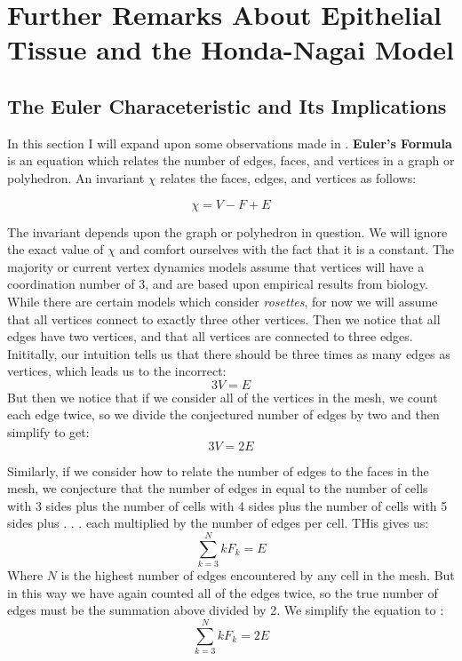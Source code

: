\chapter{Further Remarks About Epithelial Tissue and the Honda-Nagai Model}

\section{The Euler Characeteristic and Its Implications}
In this section I will expand upon some observations made in \cite{Soap}. \textbf{Euler's Formula} is an equation which relates the number of edges, faces, and vertices in a graph or polyhedron. An invariant $\chi$ relates the faces, edges, and vertices as follows:

\begin{equation}
\chi = V - F + E
\end{equation}

The invariant depends upon the graph or polyhedron in question. We will ignore the exact value of $\chi$ and comfort ourselves with the fact that it is a constant. The majority or current vertex dynamics models assume that vertices will have a coordination number of 3, and are based upon empirical results from biology. While there are certain models which consider \emph{rosettes}, for now we will assume that all vertices connect to exactly three other vertices. Then we notice that all edges have two vertices, and that all vertices are connected to three edges. Inititally, our intuition tells us that there should be three times as many edges as vertices, which leads us to the incorrect:
\begin{equation}
3V = E
\end{equation}
But then we notice that if we consider all of the vertices in the mesh, we count each edge twice, so we divide the conjectured  number of edges by two and then simplify to get:
\begin{equation}
3V = 2E
\end{equation}

Similarly, if we consider how to relate the number of edges to the faces in the mesh, we conjecture that the number of edges in equal to the number of cells with 3 sides plus the number of cells with 4 sides plus the number of cells with 5 sides plus . . . each multiplied by the number of edges per cell. THis gives us:
\begin{equation}
\sum_{k=3}^N kF_k = E
\end{equation}
Where $N$ is the highest number of edges encountered by any cell in the mesh. But in this way we have again counted all of the edges twice, so the true number of edges must be the summation above divided by 2. We simplify the equation to :
\begin{equation}
\sum_{k=3}^N kF_k = 2E
\end{equation}

